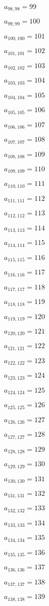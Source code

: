\documentclass[a4paper,12pt]{article}
\begin{document}
$a _{ 98, 98 } = 99$

$a _{ 99, 99 } = 100$

$a _{ 100, 100 } = 101$

$a _{ 101, 101 } = 102$

$a _{ 102, 102 } = 103$

$a _{ 103, 103 } = 104$

$a _{ 104, 104 } = 105$

$a _{ 105, 105 } = 106$

$a _{ 106, 106 } = 107$

$a _{ 107, 107 } = 108$

$a _{ 108, 108 } = 109$

$a _{ 109, 109 } = 110$

$a _{ 110, 110 } = 111$

$a _{ 111, 111 } = 112$

$a _{ 112, 112 } = 113$

$a _{ 113, 113 } = 114$

$a _{ 114, 114 } = 115$

$a _{ 115, 115 } = 116$

$a _{ 116, 116 } = 117$

$a _{ 117, 117 } = 118$

$a _{ 118, 118 } = 119$

$a _{ 119, 119 } = 120$

$a _{ 120, 120 } = 121$

$a _{ 121, 121 } = 122$

$a _{ 122, 122 } = 123$

$a _{ 123, 123 } = 124$

$a _{ 124, 124 } = 125$

$a _{ 125, 125 } = 126$

$a _{ 126, 126 } = 127$

$a _{ 127, 127 } = 128$

$a _{ 128, 128 } = 129$

$a _{ 129, 129 } = 130$

$a _{ 130, 130 } = 131$

$a _{ 131, 131 } = 132$

$a _{ 132, 132 } = 133$

$a _{ 133, 133 } = 134$

$a _{ 134, 134 } = 135$

$a _{ 135, 135 } = 136$

$a _{ 136, 136 } = 137$

$a _{ 137, 137 } = 138$

$a _{ 138, 138 } = 139$
\end{document}
